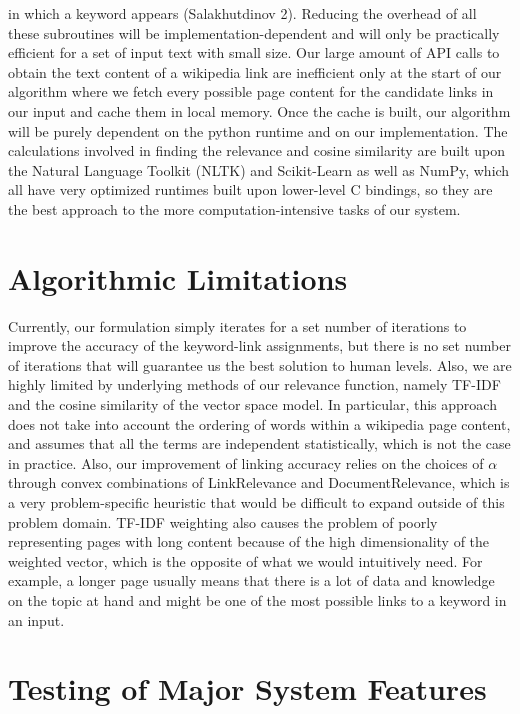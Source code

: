 \documentclass[twoside,11pt]{article}
\begin{document}
in which a keyword appears (Salakhutdinov 2). Reducing the overhead of all these subroutines will be implementation-dependent and will only be practically efficient for a set of input text with small size. Our large amount of API calls to obtain the text content of a wikipedia link are inefficient only at the start of our algorithm where we fetch every possible page content for the candidate links in our input and cache them in local memory. Once the cache is built, our algorithm will be purely dependent on the python runtime and on our implementation. The calculations involved in finding the relevance and cosine similarity are built upon the Natural Language Toolkit (NLTK) and Scikit-Learn as well as NumPy, which all have very optimized runtimes built upon lower-level C bindings, so they are the best approach to the more computation-intensive tasks of our system.

\section{Algorithmic Limitations}

Currently, our formulation simply iterates for a set number of iterations to improve the accuracy of the keyword-link assignments, but there is no set number of iterations that will guarantee us the best solution to human levels. Also, we are highly limited by underlying methods of our relevance function, namely TF-IDF and the cosine similarity of the vector space model. In particular, this approach does not take into account the ordering of words within a wikipedia page content, and assumes that all the terms are independent statistically, which is not the case in practice. Also, our improvement of linking accuracy relies on the choices of $\alpha$ through convex combinations of {\sc LinkRelevance} and {\sc DocumentRelevance}, which is a very problem-specific heuristic that would be difficult to expand outside of this problem domain. TF-IDF weighting also causes the problem of poorly representing pages with long content because of the high dimensionality of the weighted vector, which is the opposite of what we would intuitively need. For example, a longer page usually means that there is a lot of data and knowledge on the topic at hand and might be one of the most possible links to a keyword in an input.

\section{Testing of Major System Features}
\end{document}
